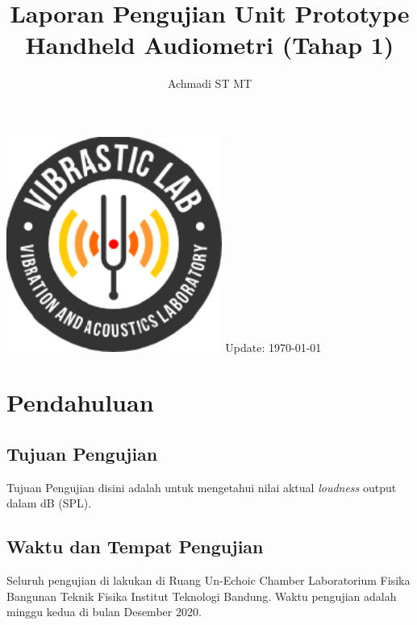 \documentclass[12pt,]{article}
\title{\LARGE \bf
	Laporan Pengujian Unit Prototype Handheld Audiometri (Tahap 1)\\
}
\author{Achmadi ST MT}
\date{}
\begin{document}
	\thispagestyle{empty}

	\begin{titlepage}
		\centering
		\vfill
		\vfill
		\maketitle
		\vfill
		\includegraphics[width=200pt]{images/logo/logoviblab}
		\vfill
		\vfill
		Update: {\today} \currenttime \\
	\end{titlepage}


	\newpage
	\tableofcontents


	\newpage
	\section{Pendahuluan}

	\subsection{Tujuan Pengujian}

	Tujuan Pengujian disini adalah untuk mengetahui nilai aktual \textit{loudness} output dalam dB (SPL).

	\subsection{Waktu dan Tempat Pengujian}

	Seluruh pengujian di lakukan di Ruang Un-Echoic Chamber Laboratorium Fisika Bangunan Teknik Fisika
	Institut Teknologi Bandung. Waktu pengujian adalah minggu kedua di bulan Desember 2020.
\end{document}
